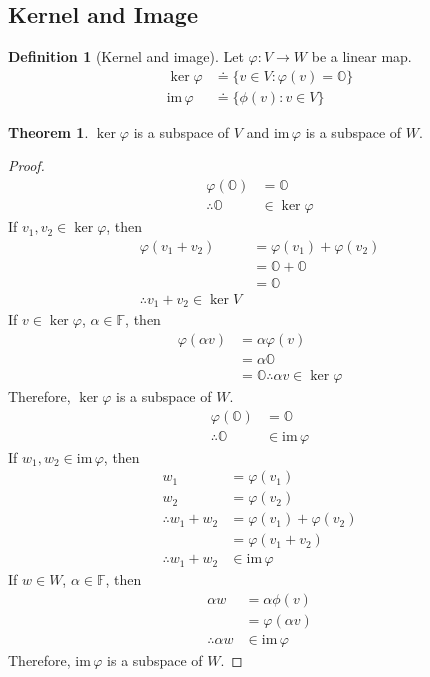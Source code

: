 \documentclass[fleqn, a4paper, 12pt, draft]{article}
\theoremstyle{definition}
\newtheorem{definition}{Definition} %
\theoremstyle{theorem}
\newtheorem{theorem}{Theorem} %
\theoremstyle{remark}
\newcommand{\im}{\mathrm{im}\,}
\numberwithin{corollary}{theorem}
\numberwithin{equation}{theorem}
\begin{document}
\subsection{Kernel and Image}

\begin{definition}[Kernel and image]
	Let $\varphi : V \to W$ be a linear map.
	\begin{align*}
		\ker \varphi &\doteq \{v \in V : \varphi (v) = \mathbb{O}\}\\
		\im \varphi &\doteq \{\phi (v) : v \in V\}
	\end{align*}
\end{definition}

\begin{theorem}
	$\ker \varphi$ is a subspace of $V$ and $\im \varphi$ is a subspace of $W$.
\end{theorem}

\begin{proof}
	\begin{align*}
		\varphi (\mathbb{O}) &= \mathbb{O}\\
		\therefore \mathbb{O} &\in \ker \varphi
	\end{align*}
	If $v_1, v_2 \in \ker \varphi$, then
	\begin{align*}
		\varphi (v_1 + v_2) &= \varphi (v_1) + \varphi (v_2)\\
		&= \mathbb{O} + \mathbb{O}\\
		&= \mathbb{O}\\
		\therefore v_1 + v_2 \in \ker V
	\end{align*}
	If $v \in \ker \varphi$, $\alpha \in \mathbb{F}$, then
	\begin{align*}
		\varphi (\alpha v) &= \alpha \varphi (v)\\
		&= \alpha \mathbb{O} \\
		&= \mathbb{O}
		\therefore \alpha v \in \ker \varphi
	\end{align*}
	Therefore, $\ker \varphi$ is a subspace of $W$.\\
	\begin{align*}
		\varphi (\mathbb{O}) &= \mathbb{O}\\
		\therefore \mathbb{O} &\in \im \varphi
	\end{align*}
	If $w_1, w_2 \in \im \varphi$, then
	\begin{align*}
		w_1 &= \varphi (v_1)\\
		w_2 &= \varphi (v_2)\\
		\therefore w_1 + w_2 &= \varphi (v_1) + \varphi (v_2)\\
		&= \varphi (v_1 + v_2)\\
		\therefore w_1 + w_2 &\in \im \varphi
	\end{align*}
	If $w \in W$, $\alpha \in \mathbb{F}$, then
	\begin{align*}
		\alpha w &= \alpha \phi (v)\\
		&= \varphi (\alpha v)\\
		\therefore \alpha w &\in \im \varphi
	\end{align*}
	Therefore, $\im \varphi$ is a subspace of $W$.
\end{proof}
\end{document}
